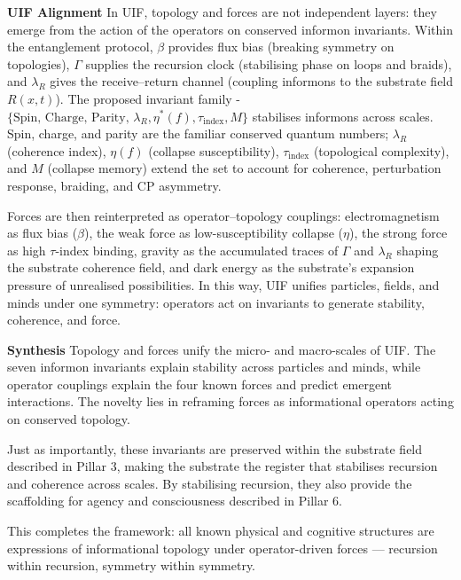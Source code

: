\noindent\textbf{UIF Alignment} 
\newline \noindent In UIF, topology and forces are not independent layers: they emerge from the action of the operators on conserved informon invariants. Within the entanglement protocol, $\beta$ provides flux bias (breaking symmetry on topologies), $\Gamma$ supplies the recursion clock (stabilising phase on loops and braids), and $\lambda_R$ gives the receive–return channel (coupling informons to the substrate field $R(x,t)$). 
\newline \indent The proposed invariant family - $\{\text{Spin, Charge, Parity, } \lambda_R, \eta^{*}(f), \tau_{\text{index}}, M\}$  stabilises informons across scales. Spin, charge, and parity are the familiar conserved quantum numbers; $\lambda_R$ (coherence index), $\eta(f)$ (collapse susceptibility), $\tau_{\text{index}}$ (topological complexity), and $M$ (collapse memory) extend the set to account for coherence, perturbation response, braiding, and CP asymmetry.

\indent Forces are then reinterpreted as operator–topology couplings: electromagnetism as flux bias ($\beta$), the weak force as low-susceptibility collapse ($\eta$), the strong force as high $\tau$-index binding, gravity as the accumulated traces of $\Gamma$ and $\lambda_R$ shaping the substrate coherence field, and dark energy as the substrate’s expansion pressure of unrealised possibilities. In this way, UIF unifies particles, fields, and minds under one symmetry: operators act on invariants to generate stability, coherence, and force.

\noindent \textbf{Synthesis}
\newline  Topology and forces unify the micro- and macro-scales of UIF. The seven informon invariants explain stability across particles and minds, while operator couplings explain the four known forces and predict emergent interactions. The novelty lies in reframing forces as informational operators acting on conserved topology.

Just as importantly, these invariants are preserved within the substrate field described in Pillar 3, making the substrate the register that stabilises recursion and coherence across scales. By stabilising recursion, they also provide the scaffolding for agency and consciousness described in Pillar 6.

\noindent
This completes the framework: all known physical and cognitive structures are expressions of informational topology under operator-driven forces — recursion within recursion, symmetry within symmetry.
\clearpage

